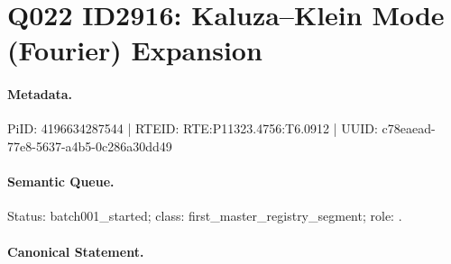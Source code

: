 \section*{Q022 ID2916: Kaluza–Klein Mode (Fourier) Expansion}
\paragraph{Metadata.}
PiID: 4196634287544 | RTEID: RTE:P11323.4756:T6.0912 | UUID: c78eaead-77e8-5637-a4b5-0c286a30dd49

\paragraph{Semantic Queue.}
Status: batch001\_started; class: first\_master\_registry\_segment; role: .

\paragraph{Canonical Statement.}

